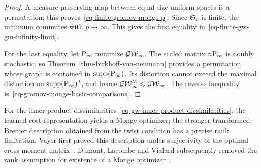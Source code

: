\begin{proof}
	A measure-preserving map between equal-size uniform spaces is a permutation; this proves~\eqref{eq-finite-gromov-monge-p}. Since $\mathfrak S_n$ is finite, the minimum commutes with $p\to\infty$. This gives the first equality in~\eqref{eq-finite-gw-gm-infinity-limit}.

	For the last equality, let $\P_\infty$ minimize $\GW_\infty$. The scaled matrix $n\P_\infty$ is doubly stochastic, so Theorem~\ref{thm-birkhoff-von-neumann} provides a permutation whose graph is contained in $\supp(\P_\infty)$. Its distortion cannot exceed the maximal distortion on $\supp(\P_\infty)^2$, and hence $\GW_\infty^{\mathrm M}\leq\GW_\infty$. The reverse inequality is~\eqref{eq-gromov-monge-basic-comparisons}.
\end{proof}

For the inner-product dissimilarities~\eqref{eq-gw-inner-product-dissimilarities}, the learned-cost representation yields a Monge optimizer; the stronger transformed-Brenier description obtained from the twist condition has a precise rank limitation. Vayer first proved this description under surjectivity of the optimal cross-moment matrix~\cite[Theorem~4.2.3]{Vayer2020IncomparableSpaces}. Dumont, Lacombe and Vialard subsequently removed the rank assumption for existence of a Monge optimizer~\cite{DumontLacombeVialard2025}.


